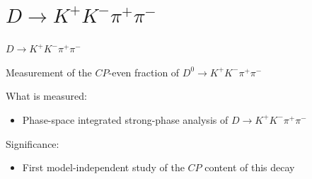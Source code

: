 \documentclass{beamer}
\begin{document}
\section{\texorpdfstring{$D\to K^+K^-\pi^+\pi^-$}{D2KKpipi}}
\begin{frame}{$D\to K^+K^-\pi^+\pi^-$}
  \begin{tcolorbox}[enhanced,frame style image=blueshade_cropped.png,
    opacityback=0.75,opacitybacktitle=0.25,
    colback=blue!5!white,colframe=blue!75!black,
    title=\color{white}{\href{https://journals.aps.org/prd/abstract/10.1103/PhysRevD.107.032009}{\color{white}{Phys. Rev. D \textbf{107} 032009}}}]
    {\Large Measurement of the $C\!P$-even fraction of $D^0\to K^+K^-\pi^+\pi^-$}
  \end{tcolorbox}
  \vspace{0.7cm}
  What is measured:
  \begin{itemize}
    \item{Phase-space integrated strong-phase analysis of $D\to K^+K^-\pi^+\pi^-$}
  \end{itemize}
  \vspace{0.7cm}
  Significance:
  \begin{itemize}
    \item{First model-independent study of the $C\!P$ content of this decay}
  \end{itemize}
\end{frame}
\end{document}
